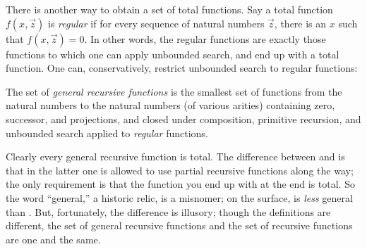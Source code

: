 \documentclass[../../include/open-logic-section]{subfiles}
\begin{document}

There is another way to obtain a set of total functions. Say a total
function $f(x,\vec z)$ is \emph{regular} if for every sequence of
natural numbers $\vec z$, there is an $x$ such that $f(x,\vec z) = 0$.
In other words, the regular functions are exactly those functions to
which one can apply unbounded search, and end up with a total
function. One can, conservatively, restrict unbounded search to
regular functions:

\begin{defn}
The set of \emph{general recursive functions} is the smallest set of
functions from the natural numbers to the natural numbers (of various
arities) containing zero, successor, and projections, and closed under
composition, primitive recursion, and unbounded search applied to
\emph{regular} functions.
\end{defn}

Clearly every general recursive function is total. The difference
between  and
 is that in the latter one is allowed to
use partial recursive functions along the way; the only requirement is
that the function you end up with at the end is total. So the word
``general,'' a historic relic, is a misnomer; on the surface,
 is \emph{less} general than
. But, fortunately, the difference is
illusory; though the definitions are different, the set of general
recursive functions and the set of recursive functions are one and the
same.
\end{document}
